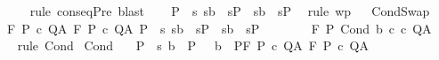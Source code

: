 \begin{isabellebody}
\ \ \ \ \isamarkupfalse%
\ {\isacharparenleft}rule\ conseqPre{\isacharparenright}\ blast\isanewline
{}\isamarkupfalse%
\isanewline
\ \ \isamarkupfalse%
\ {\isachardoublequoteopen}P\ {\isasymsubseteq}\ {\isacharbraceleft}s{\isachardot}\ {\isacharparenleft}s{\isasymin}b\ {\isasymlongrightarrow}\ s{\isasymin}P\ {\isasymand}\ {\isacharparenleft}s{\isasymnotin}b\ {\isasymlongrightarrow}\ s{\isasymin}P\ \isamarkupfalse%
\ {\isacharparenleft}rule\ wp{\isacharparenright}\isanewline
{}\isamarkupfalse%
%
\endisatagproof
{\isafoldproof}%
%
\isadelimproof
\ \isanewline
%
\endisadelimproof
\isanewline
\isanewline
{}\isamarkupfalse%
\ CondSwap{\isacharcolon}\ \isanewline
\ \ {\isachardoublequoteopen}{\isasymlbrakk}{\isasymGamma}{\isacharcomma}{\isasymTheta}{\isasymturnstile}\isactrlbsub {\isacharslash}F\isactrlesub \ P{}\ c{}\ Q{\isacharcomma}A{\isacharsemicolon}\ {\isasymGamma}{\isacharcomma}{\isasymTheta}{\isasymturnstile}\isactrlbsub {\isacharslash}F\isactrlesub \ P{}\ c{}\ Q{\isacharcomma}A{\isacharsemicolon}\ P\ {\isasymsubseteq}\ {\isacharbraceleft}s{\isachardot}\ {\isacharparenleft}s{\isasymin}b\ {\isasymlongrightarrow}\ s{\isasymin}P{}{\isacharparenright}\ {\isasymand}\ {\isacharparenleft}s{\isasymnotin}b\ {\isasymlongrightarrow}\ s{\isasymin}P{}{\isacharparenright}{\isacharbraceright}{\isasymrbrakk}\isanewline
\ \ \ {\isasymLongrightarrow}\ \isanewline
\ \ \ {\isasymGamma}{\isacharcomma}{\isasymTheta}{\isasymturnstile}\isactrlbsub {\isacharslash}F\isactrlesub \ P\ {\isacharparenleft}Cond\ b\ c{}\ c{}{\isacharparenright}\ Q{\isacharcomma}A{\isachardoublequoteclose}\isanewline
%
\isadelimproof
\ \ %
\endisadelimproof
%
\isatagproof
{}\isamarkupfalse%
\ {\isacharparenleft}rule\ Cond{\isacharparenright}%
\endisatagproof
{\isafoldproof}%
%
\isadelimproof
\isanewline
%
\endisadelimproof
\isanewline
{}\isamarkupfalse%
\ Cond{\isacharprime}{\isacharcolon}\ \isanewline
\ \ {\isachardoublequoteopen}{\isasymlbrakk}P\ {\isasymsubseteq}\ {\isacharbraceleft}s{\isachardot}\ {\isacharparenleft}b\ {\isasymsubseteq}\ P{}{\isacharparenright}\ {\isasymand}\ {\isacharparenleft}{\isacharminus}\ b\ {\isasymsubseteq}\ P{}{\isacharparenright}{\isacharbraceright}{\isacharsemicolon}{\isasymGamma}{\isacharcomma}{\isasymTheta}{\isasymturnstile}\isactrlbsub {\isacharslash}F\isactrlesub \ P{}\ c{}\ Q{\isacharcomma}A{\isacharsemicolon}\ {\isasymGamma}{\isacharcomma}{\isasymTheta}{\isasymturnstile}\isactrlbsub {\isacharslash}F\isactrlesub \ P{}\ c{}\ Q{\isacharcomma}A{\isasymrbrakk}\isanewline

\end{isabellebody}
